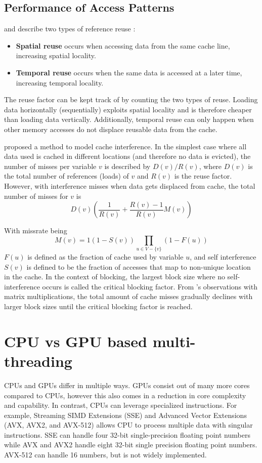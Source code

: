 \subsection{Performance of Access Patterns}
\citeauthor{lam1991cache} and \citeauthor{meyer2003algorithms} describe two types of reference reuse \cite{lam1991cache, meyer2003algorithms}:
\begin{itemize}
    \item \textbf{Spatial reuse} occurs when accessing data from the same cache line, increasing spatial locality.
    \item \textbf{Temporal reuse} occurs when the same data is accessed at a later time, increasing temporal locality.
\end{itemize}
The reuse factor can be kept track of by counting the two types of reuse.
Loading data horizontally (sequentially) exploits spatial locality and is therefore cheaper than loading data vertically.
Additionally, temporal reuse can only happen when other memory accesses do not displace reusable data from the cache.

\citeauthor{lam1991cache} proposed a method to model cache interference.
In the simplest case where all data used is cached in different locations (and therefore no data is evicted), the number of misses per variable $v$ is described by $D(v)/R(v)$, where $D(v)$ is the total number of references (loads) of $v$ and $R(v)$ is the reuse factor.
However, with interference misses when data gets displaced from cache, the total number of misses for $v$ is
\[
    D(v)\left(\frac{1}{R(v)}+\frac{R(v)-1}{R(v)}M(v)\right)
\]

With missrate being
\[
    M(v) = 1 \left(1 - S(v)\right) \prod_{u\in V - \{v\}}\left(1 - F(u)\right)
\]
$F(u)$ is defined as the fraction of cache used by variable $u$, and self interference $S(v)$ is defined to be the fraction of accesses that map to non-unique location in the cache.
In the context of blocking, the largest block size where no self-interference occurs is called the critical blocking factor.
From \citeauthor{lam1991cache}'s observations with matrix multiplications, the total amount of cache misses gradually declines with larger block sizes until the critical blocking factor is reached.



\section{CPU vs GPU based multi-threading}
CPUs and GPUs differ in multiple ways.
GPUs consist out of many more cores compared to CPUs, however this also comes in a reduction in core complexity and capability.
In contrast, CPUs can leverage specialized instructions.
For example, Streaming SIMD Extensions (SSE) and Advanced Vector Extensions (AVX, AVX2, and AVX-512) allows CPU to process multiple data with singular instructions.
SSE can handle four 32-bit single-precision floating point numbers while AVX and AVX2 handle eight 32-bit single precision floating point numbers.
AVX-512 can handle 16 numbers, but is not widely implemented.

